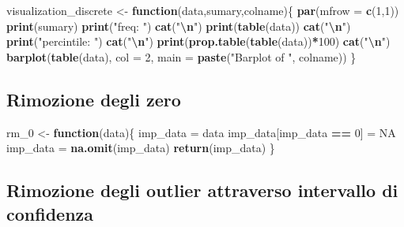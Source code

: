\documentclass[
]{article}
\newenvironment{Shaded}{\begin{snugshade}}{\end{snugshade}}
\newcommand{\AttributeTok}[1]{\textcolor[rgb]{0.13,0.29,0.53}{#1}}
\newcommand{\ConstantTok}[1]{\textcolor[rgb]{0.56,0.35,0.01}{#1}}
\newcommand{\ControlFlowTok}[1]{\textcolor[rgb]{0.13,0.29,0.53}{\textbf{#1}}}
\newcommand{\DecValTok}[1]{\textcolor[rgb]{0.00,0.00,0.81}{#1}}
\newcommand{\FunctionTok}[1]{\textcolor[rgb]{0.13,0.29,0.53}{\textbf{#1}}}
\newcommand{\NormalTok}[1]{#1}
\newcommand{\OtherTok}[1]{\textcolor[rgb]{0.56,0.35,0.01}{#1}}
\newcommand{\SpecialCharTok}[1]{\textcolor[rgb]{0.81,0.36,0.00}{\textbf{#1}}}
\newcommand{\StringTok}[1]{\textcolor[rgb]{0.31,0.60,0.02}{#1}}
\begin{document}
\begin{Shaded}
\begin{Highlighting}[]
\NormalTok{visualization\_discrete }\OtherTok{\textless{}{-}} \ControlFlowTok{function}\NormalTok{(data,sumary,colname)\{}
  \FunctionTok{par}\NormalTok{(}\AttributeTok{mfrow =} \FunctionTok{c}\NormalTok{(}\DecValTok{1}\NormalTok{,}\DecValTok{1}\NormalTok{))}
  \FunctionTok{print}\NormalTok{(sumary)}
  \FunctionTok{print}\NormalTok{(}\StringTok{"freq: "}\NormalTok{)}
  \FunctionTok{cat}\NormalTok{(}\StringTok{"}\SpecialCharTok{\textbackslash{}n}\StringTok{"}\NormalTok{)}
  \FunctionTok{print}\NormalTok{(}\FunctionTok{table}\NormalTok{(data))}
  \FunctionTok{cat}\NormalTok{(}\StringTok{"}\SpecialCharTok{\textbackslash{}n}\StringTok{"}\NormalTok{)}
  \FunctionTok{print}\NormalTok{(}\StringTok{"percintile: "}\NormalTok{)}
  \FunctionTok{cat}\NormalTok{(}\StringTok{"}\SpecialCharTok{\textbackslash{}n}\StringTok{"}\NormalTok{)}
  \FunctionTok{print}\NormalTok{(}\FunctionTok{prop.table}\NormalTok{(}\FunctionTok{table}\NormalTok{(data))}\SpecialCharTok{*}\DecValTok{100}\NormalTok{)}
  \FunctionTok{cat}\NormalTok{(}\StringTok{"}\SpecialCharTok{\textbackslash{}n}\StringTok{"}\NormalTok{)}
  \FunctionTok{barplot}\NormalTok{(}\FunctionTok{table}\NormalTok{(data), }\AttributeTok{col =} \DecValTok{2}\NormalTok{, }\AttributeTok{main =} \FunctionTok{paste}\NormalTok{(}\StringTok{"Barplot of "}\NormalTok{, colname))}
\NormalTok{\}}
\end{Highlighting}
\end{Shaded}

\subsection{Rimozione degli zero}\label{rimozione-degli-zero}

\begin{Shaded}
\begin{Highlighting}[]
\NormalTok{rm\_0 }\OtherTok{\textless{}{-}} \ControlFlowTok{function}\NormalTok{(data)\{}
\NormalTok{  imp\_data }\OtherTok{=}\NormalTok{ data}
\NormalTok{  imp\_data[imp\_data }\SpecialCharTok{==} \DecValTok{0}\NormalTok{] }\OtherTok{=} \ConstantTok{NA}
\NormalTok{  imp\_data }\OtherTok{=} \FunctionTok{na.omit}\NormalTok{(imp\_data)}
  \FunctionTok{return}\NormalTok{(imp\_data)}
\NormalTok{\}}
\end{Highlighting}
\end{Shaded}

\subsection{Rimozione degli outlier attraverso intervallo di
confidenza}\label{rimozione-degli-outlier-attraverso-intervallo-di-confidenza}
\end{document}
